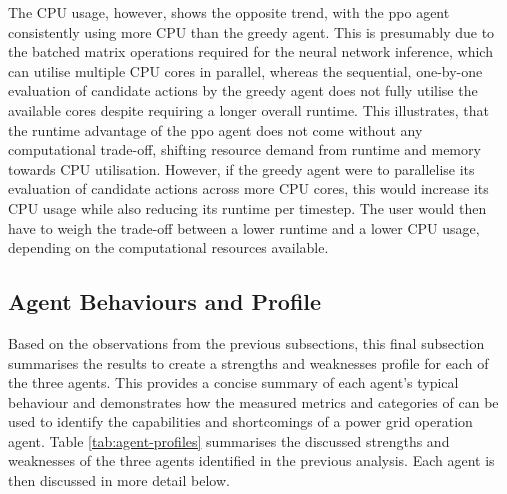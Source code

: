 The CPU usage, however, shows the opposite trend, with the \ac{ppo} agent consistently using more CPU than the greedy agent. This is presumably due to the batched matrix operations required for the neural network inference, which can utilise multiple CPU cores in parallel, whereas the sequential, one-by-one evaluation of candidate actions by the greedy agent does not fully utilise the available cores despite requiring a longer overall runtime. This illustrates, that the runtime advantage of the \ac{ppo} agent does not come without any computational trade-off, shifting resource demand from runtime and memory towards CPU utilisation. However, if the greedy agent were to parallelise its evaluation of candidate actions across more CPU cores, this would increase its CPU usage while also reducing its runtime per timestep. The user would then have to weigh the trade-off between a lower runtime and a lower CPU usage, depending on the computational resources available.



\subsection{Agent Behaviours and Profile}\label{ssec:agent-profiles}
Based on the observations from the previous subsections, this final subsection summarises the results to create a strengths and weaknesses profile for each of the three agents. This provides a concise summary of each agent's typical behaviour and demonstrates how the measured metrics and categories of \benchmark can be used to identify the capabilities and shortcomings of a power grid operation agent. Table \ref{tab:agent-profiles} summarises the discussed strengths and weaknesses of the three agents identified in the previous analysis. Each agent is then discussed in more detail below.


